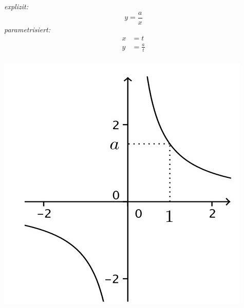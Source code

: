 \vspace{3pt}
\begin{minipage}{0.5\linewidth}
        \vspace{0.5em}
        \textit{explizit:}
        $$
            y = \frac{a}{x}
        $$
        \textit{parametrisiert:}
        \begin{align*}
            x &= t\\
            y &= \frac{a}{t}\\
        \end{align*}
\end{minipage}
\begin{minipage}{0.49\linewidth}
        \includegraphics[width=0.8\linewidth]{src/Appendix/Hyperbel 2.jpg}
\end{minipage}

